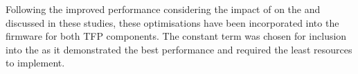 Following the improved performance considering the impact of \MS on the \HT and \KF discussed in these studies, these optimisations have been incorporated into the firmware for both TFP components.
The constant \MS term was chosen for inclusion into the \KF as it demonstrated the best performance and required the least resources to implement.

